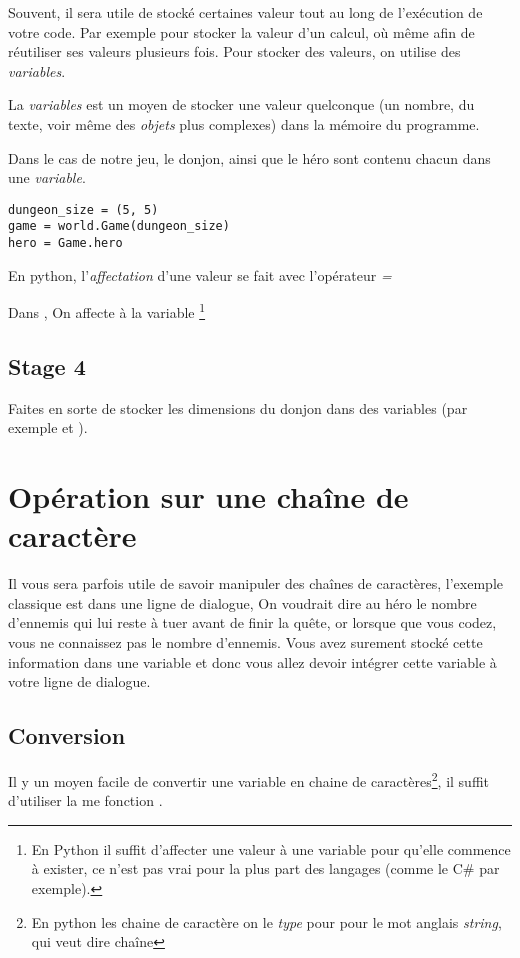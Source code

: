Souvent, il sera utile de stocké certaines valeur tout au long de l’exécution de votre code.
Par exemple pour stocker la valeur d’un calcul, où même afin de réutiliser ses valeurs plusieurs fois. Pour stocker des valeurs, on utilise des \emph{variables}.

La \emph{variables} est un moyen de stocker une valeur quelconque (un nombre, du texte, voir même des \emph{objets} plus complexes) dans la mémoire du programme.

Dans le cas de notre jeu, le donjon, ainsi que le héro sont contenu chacun dans une \emph{variable}.

\begin{lstlisting}
dungeon_size = (5, 5)
game = world.Game(dungeon_size)
hero = Game.hero
\end{lstlisting}

En python, l’\emph{affectation} d’une valeur se fait avec l’opérateur \emph{=}

Dans , On affecte  à la variable \footnote{ En Python il suffit d’affecter une valeur à une variable pour qu’elle commence à exister, ce n’est pas vrai pour la plus part des langages (comme le C\# par exemple).}

\subsection{Stage 4}
Faites en sorte de stocker les dimensions du donjon dans des variables (par exemple  et ).

\section{Opération sur une chaîne de caractère}

Il vous sera parfois utile de savoir manipuler des chaînes de caractères, l'exemple classique est dans une ligne de dialogue, On voudrait dire au héro le nombre d'ennemis qui lui reste à tuer avant de finir la quête, or lorsque que vous codez, vous ne connaissez pas le nombre d'ennemis. Vous avez surement stocké cette information dans une variable et donc vous allez devoir intégrer cette variable à votre ligne de dialogue.

\subsection{Conversion}
Il y un moyen facile de convertir une variable en chaine de caractères\footnote{En python les chaine de caractère on le \emph{type}  pour pour le mot anglais \textit{string}, qui veut dire chaîne}, il suffit d'utiliser la me fonction .

